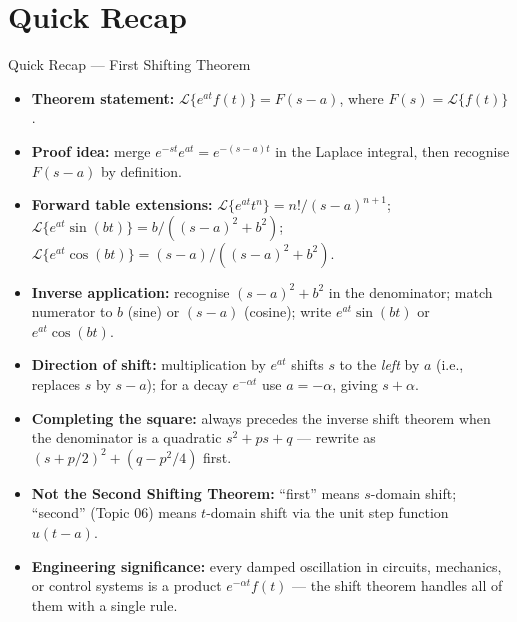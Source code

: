 \documentclass[12pt,a4paper]{article}
\begin{document}
\section{Quick Recap}

\begin{learnbox}{Quick Recap --- First Shifting Theorem}
\begin{itemize}[noitemsep]
  \item \textbf{Theorem statement:} $\mathcal{L}\{e^{at}f(t)\} = F(s-a)$,
        where $F(s) = \mathcal{L}\{f(t)\}$.
  \item \textbf{Proof idea:} merge $e^{-st}e^{at} = e^{-(s-a)t}$ in the Laplace integral,
        then recognise $F(s-a)$ by definition.
  \item \textbf{Forward table extensions:}
        $\mathcal{L}\{e^{at}t^n\} = n!/(s-a)^{n+1}$;
        $\mathcal{L}\{e^{at}\sin(bt)\} = b/((s-a)^2+b^2)$;
        $\mathcal{L}\{e^{at}\cos(bt)\} = (s-a)/((s-a)^2+b^2)$.
  \item \textbf{Inverse application:} recognise $(s-a)^2+b^2$ in the denominator;
        match numerator to $b$ (sine) or $(s-a)$ (cosine); write $e^{at}\sin(bt)$ or $e^{at}\cos(bt)$.
  \item \textbf{Direction of shift:} multiplication by $e^{at}$ shifts $s$ to the \emph{left} by $a$
        (i.e., replaces $s$ by $s-a$); for a decay $e^{-\alpha t}$ use $a=-\alpha$, giving $s+\alpha$.
  \item \textbf{Completing the square:} always precedes the inverse shift theorem when the denominator
        is a quadratic $s^2 + ps + q$ --- rewrite as $(s+p/2)^2 + (q - p^2/4)$ first.
  \item \textbf{Not the Second Shifting Theorem:} ``first'' means $s$-domain shift; ``second'' (Topic 06)
        means $t$-domain shift via the unit step function $u(t-a)$.
  \item \textbf{Engineering significance:} every damped oscillation in circuits, mechanics, or control
        systems is a product $e^{-\alpha t}f(t)$ --- the shift theorem handles all of them with
        a single rule.
\end{itemize}
\end{learnbox}
\end{document}

